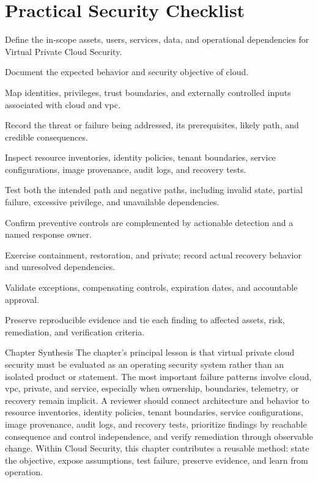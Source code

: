 \documentclass[11pt,letterpaper]{article}
\begin{document}
\section*{Practical Security Checklist}
\begin{CornellChecklist}
\item Define the in-scope assets, users, services, data, and operational dependencies for Virtual Private Cloud Security.
\item Document the expected behavior and security objective of cloud.
\item Map identities, privileges, trust boundaries, and externally controlled inputs associated with cloud and vpc.
\item Record the threat or failure being addressed, its prerequisites, likely path, and credible consequences.
\item Inspect resource inventories, identity policies, tenant boundaries, service configurations, image provenance, audit logs, and recovery tests.
\item Test both the intended path and negative paths, including invalid state, partial failure, excessive privilege, and unavailable dependencies.
\item Confirm preventive controls are complemented by actionable detection and a named response owner.
\item Exercise containment, restoration, and private; record actual recovery behavior and unresolved dependencies.
\item Validate exceptions, compensating controls, expiration dates, and accountable approval.
\item Preserve reproducible evidence and tie each finding to affected assets, risk, remediation, and verification criteria.
\end{CornellChecklist}
\begin{CornellSummaryBox}{Chapter Synthesis}
The chapter's principal lesson is that virtual private cloud security must be evaluated as an operating security system rather than an isolated product or statement. The most important failure patterns involve cloud, vpc, private, and service, especially when ownership, boundaries, telemetry, or recovery remain implicit. A reviewer should connect architecture and behavior to resource inventories, identity policies, tenant boundaries, service configurations, image provenance, audit logs, and recovery tests, prioritize findings by reachable consequence and control independence, and verify remediation through observable change. Within Cloud Security, this chapter contributes a reusable method: state the objective, expose assumptions, test failure, preserve evidence, and learn from operation.
\end{CornellSummaryBox}
\end{document}
